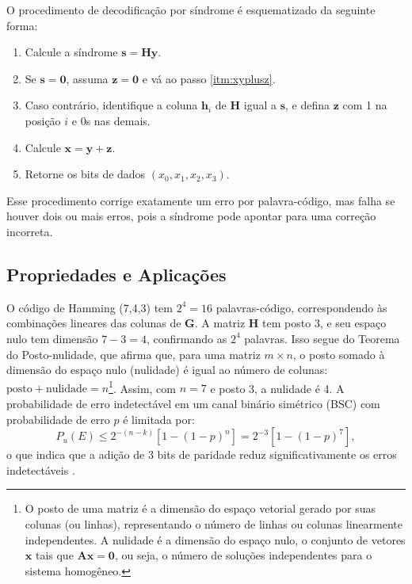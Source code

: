 O procedimento de decodificação por síndrome é esquematizado da seguinte forma:
\begin{enumerate}[itemsep=0pt, topsep=0pt, parsep=0pt, partopsep=0pt]
    \item Calcule a síndrome $\mathbf{s} = \mathbf{H} \mathbf{y}$.
    \item Se $\mathbf{s} = \mathbf{0}$, assuma $\mathbf{z} = \mathbf{0}$ e vá ao passo \ref{itm:xyplusz}.
    \item Caso contrário, identifique a coluna $\mathbf{h}_i$ de $\mathbf{H}$ igual a $\mathbf{s}$, e defina $\mathbf{z}$ com 1 na posição $i$ e 0s nas demais.
    \item\label{itm:xyplusz} Calcule $\mathbf{x} = \mathbf{y} + \mathbf{z}$.
    \item Retorne os bits de dados $(x_0, x_1, x_2, x_3)$.
\end{enumerate}
Esse procedimento corrige exatamente um erro por palavra-código, mas falha se
houver dois ou mais erros, pois a síndrome pode apontar para uma correção
incorreta.

\subsection{Propriedades e Aplicações}

O código de Hamming (7,4,3) tem $2^4 = 16$ palavras-código, correspondendo 
às combinações lineares das colunas de $\mathbf{G}$. A matriz $\mathbf{H}$ 
tem posto 3, e seu espaço nulo tem dimensão $7 - 3 = 4$, confirmando as 
$2^4$ palavras. Isso segue do Teorema do Posto-nulidade, que afirma que, 
para uma matriz $m \times n$, o posto somado à dimensão do espaço nulo 
(nulidade) é igual ao número de colunas: $\text{posto} + \text{nulidade} = n $\footnote{
O posto de uma matriz é a dimensão do espaço vetorial gerado por suas colunas (ou linhas), 
representando o número de linhas ou colunas linearmente independentes. 
A nulidade é a dimensão do espaço nulo, o conjunto de vetores $\mathbf{x}$ 
tais que $\mathbf{A} \mathbf{x} = \mathbf{0}$, ou seja, o número de soluções
independentes para o sistema homogêneo.}. 
Assim, com $n = 7$ e posto 3, a nulidade é 4. 
A probabilidade de erro indetectável em um canal binário simétrico (BSC) 
com probabilidade de erro $p$ é limitada por:
\begin{equation}
P_u(E) \leq 2^{-(n-k)} [1 - (1-p)^n] = 2^{-3} [1 - (1-p)^7],
\end{equation}
o que indica que a adição de 3 bits de paridade reduz significativamente os erros indetectáveis \parencite{costello2004}.



